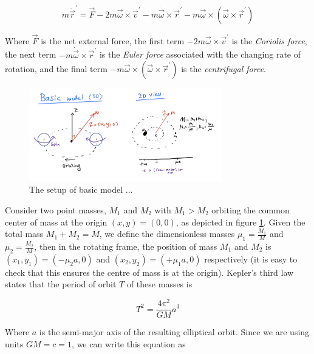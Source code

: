 \documentclass{article}
\begin{document}
\begin{equation}
        \label{eq:Fictitious forces}
        m \ddot{\vec{r}}^{\prime} = \vec{F} - 2 m \vec{\omega} \times \vec{v}^{\prime} - m \dot{\vec{\omega}} \times \vec{r}^{\prime} - m \vec{\omega} \times \left(  \vec{\omega} \times \vec{r}^{\prime}  \right)
\end{equation}

Where $\vec{F}$ is the net external force, the first term $- 2 m \vec{\omega} \times \vec{v}^{\prime}$ is the \textit{Coriolis force}, the next term $- m \dot{\vec{\omega}} \times \vec{r}^{\prime}$ is the \textit{Euler force} associated with the changing rate of rotation, and the final term $- m \vec{\omega} \times \left(  \vec{\omega} \times \vec{r}^{\prime}  \right)$ is the \textit{centrifugal force}.

\begin{figure}
    \centering
    \includegraphics[width=0.75\textwidth]{images/basic_model_img.jpeg}
    \caption{The setup of basic model ...}
    \label{fig:basic model}
\end{figure}

Consider two point masses, $M_1$ and $M_2$ with $M_1 > M_2$ orbiting the common center of mass at the origin $(x,y)=(0,0)$, as depicted in figure \ref{fig:basic model}. Given the total mass $M_1+M_2=M$, we define the dimensionless masses $\mu_1=\frac{M_1}{M}$ and $\mu_2=\frac{M_2}{M}$, then in the rotating frame, the position of mass $M_1$ and $M_2$ is $(x_1, y_1)=(-\mu_2 a, 0)$ and $(x_2, y_2)=(+\mu_1 a, 0)$ respectively (it is easy to check that this ensures the centre of mass is at the origin). Kepler's third law states that the period of orbit $T$ of these masses is 

\begin{equation}
    T^2 = \frac{4 \pi^2}{G M} a^3
\end{equation}

Where $a$ is the semi-major axis of the resulting elliptical orbit. Since we are using units $G M=c=1$, we can write this equation as
\end{document}
